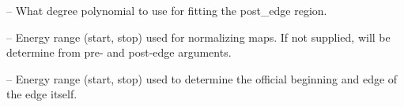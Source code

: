 \documentclass[letterpaper,10pt,english]{sphinxmanual}
\begin{document}
\begin{fulllineitems}
\begin{fulllineitems}
\end{fulllineitems}


\begin{fulllineitems}
\label{\detokenize{xanespy:xanespy.edges.Edge.post_edge_order}}
 -- What degree polynomial to use for fitting the post\_edge region.

\end{fulllineitems}


\begin{fulllineitems}
\label{\detokenize{xanespy:xanespy.edges.Edge.map_range}}
 -- Energy range (start, stop) used for normalizing maps. If not
supplied, will be determine from pre- and post-edge arguments.

\end{fulllineitems}


\begin{fulllineitems}
\label{\detokenize{xanespy:xanespy.edges.Edge.edge_range}}
 -- Energy range (start, stop) used to determine the official
beginning and edge of the edge itself.

\end{fulllineitems}


\begin{fulllineitems}
\end{fulllineitems}


\begin{fulllineitems}
\label{\detokenize{xanespy:xanespy.edges.Edge.all_energies}}
\end{fulllineitems}


\begin{fulllineitems}
\end{fulllineitems}


\end{fulllineitems}
\end{document}
